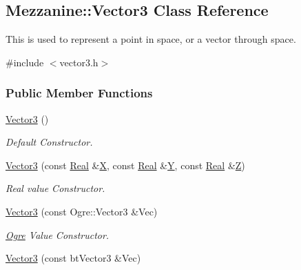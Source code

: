 \hypertarget{classMezzanine_1_1Vector3}{
\subsection{Mezzanine::Vector3 Class Reference}
\label{classMezzanine_1_1Vector3}
}


This is used to represent a point in space, or a vector through space.  




{\ttfamily \#include $<$vector3.h$>$}

\subsubsection*{Public Member Functions}
\begin{DoxyCompactItemize}
\item 
\hyperlink{classMezzanine_1_1Vector3_a55ef98afbd1e780c6d7dabf0ef7d006f}{Vector3} ()
\begin{DoxyCompactList}\small\item\em Default Constructor. \item\end{DoxyCompactList}\item 
\hyperlink{classMezzanine_1_1Vector3_a4856d97eabe608eb35abc07b9a8260c6}{Vector3} (const \hyperlink{namespaceMezzanine_a726731b1a7df72bf3583e4a97282c6f6}{Real} \&\hyperlink{classMezzanine_1_1Vector3_aa858d9bc5ac5ad1b685b7088c94c05f6}{X}, const \hyperlink{namespaceMezzanine_a726731b1a7df72bf3583e4a97282c6f6}{Real} \&\hyperlink{classMezzanine_1_1Vector3_a2303527e4ea4cd1659a23320627cd62c}{Y}, const \hyperlink{namespaceMezzanine_a726731b1a7df72bf3583e4a97282c6f6}{Real} \&\hyperlink{classMezzanine_1_1Vector3_a9b887faced986921956f20f3e4cb8ddc}{Z})
\begin{DoxyCompactList}\small\item\em Real value Constructor. \item\end{DoxyCompactList}\item 
\hyperlink{classMezzanine_1_1Vector3_a1044f4ea5fd3bddc6afb49209a14f4b9}{Vector3} (const Ogre::Vector3 \&Vec)
\begin{DoxyCompactList}\small\item\em \hyperlink{namespaceOgre}{Ogre} Value Constructor. \item\end{DoxyCompactList}\item 
\hyperlink{classMezzanine_1_1Vector3_a98311dcd61c647fbe0285ba3cef00164}{Vector3} (const btVector3 \&Vec)

\end{DoxyCompactItemize}
